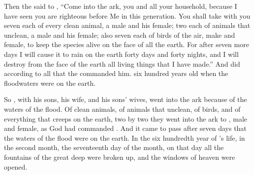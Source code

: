 
\bverse Then the \lord said to , ``Come into the ark, you and all your household, because I have seen \that you are righteous before Me in this generation.
\bverse You shall take with you seven each of every clean animal, a male and his female; two each of animals that \are unclean, a male and his female;
\bverse also seven each of birds of the air, make and female, to keep the species alive on the face of all the earth.
\bverse For after seven more days I will cause it to rain on the earth forty days and forty nights, and I will destroy from the face of the earth all living things that I have made.''
\bverse And  did according to all that the \lord commanded him.
\bverse {} \was six hundred years old when the floodwaters were on the earth.

\bverse So , with his sons, his wife, and his sons' wives, went into the ark because of the waters of the flood.
\bverse Of clean animals, of animals that \are unclean, of birds, and of everything that creeps on the earth,
\bverse two by two they went into the ark to , male and female, as God had commanded .
\bverse And it came to pass after seven days that the waters of the flood were on the earth.
\bverse In the six hundredth year of 's life, in the second month, the seventeenth day of the month, on that day all the fountains of the great deep were broken up, and the windows of heaven were opened.

